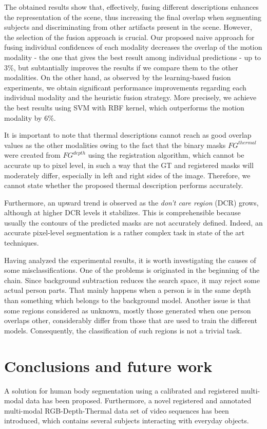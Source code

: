 \documentclass[10pt,twocolumn,letterpaper]{article}
\begin{document}
The obtained results show that, effectively, fusing different descriptions enhances the representation of the scene, thus increasing the final overlap when segmenting subjects and discriminating from other artifacts present in the scene. However, the selection of the fusion approach is crucial. Our proposed naive approach for fusing individual confidences of each modality decreases the overlap of the motion modality - the one that gives the best result among individual predictions -  up to 3\%, but subtantially improves the results if we compare them to the other modalities. On the other hand, as observed by the learning-based fusion experiments, we obtain significant performance improvements regarding each individual modality and the heuristic fusion strategy. More precisely, we achieve the best results using SVM with RBF kernel, which outperforms the motion modality by 6\%.

It is important to note that thermal descriptions cannot reach as good overlap values as the other modalities owing to the fact that the binary masks $FG^{thermal}$ were created from $FG^{depth}$ using the registration algorithm, which cannot be accurate up to pixel level, in such a way that the GT and registered masks will moderately differ, especially in left and right sides of the image. Therefore, we cannot state whether the proposed thermal description performs accurately.

Furthermore, an upward trend is observed as the \emph{don't care region} (DCR) grows, although at higher DCR levels it stabilizes. This is comprehensible because usually the contours of the predicted masks are not accurately defined. Indeed, an accurate pixel-level segmentation is a rather complex task in state of the art techniques.

Having analyzed the experimental results, it is worth investigating the causes of some
misclassifications. One of the problems is originated in the beginning of the chain. Since
background subtraction reduces the search space, it may reject some actual person parts.
That mainly happens when a person is in the same depth than something which belongs
to the background model. Another issue is that some regions considered as unknown,
mostly those generated when one person overlaps other, considerably differ from those
that are used to train the different models. Consequently, the classification of such regions
is not a trivial task.

\section{Conclusions and future work}
\label{sec:conclusions}
A solution for human body segmentation using a calibrated and registered multi-modal data has been proposed. Furthermore, a novel registered and annotated multi-modal RGB-Depth-Thermal data set of video sequences has been introduced, which contains several
subjects interacting with everyday objects.
\end{document}
